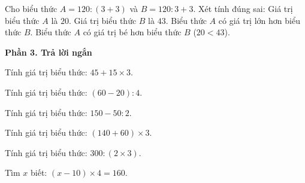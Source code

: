 \begin{ex} %
Cho biểu thức $A = 120 : (3 + 3)$ và $B = 120 : 3 + 3$. Xét tính đúng sai:
\choiceTF
{\True Giá trị biểu thức $A$ là $20$.}
{\True Giá trị biểu thức $B$ là $43$.}
{Biểu thức $A$ có giá trị lớn hơn biểu thức $B$.}
{\True Biểu thức $A$ có giá trị bé hơn biểu thức $B$ ($20 < 43$).}
\end{ex}

\textbf{Phần 3. Trả lời ngắn}

\begin{ex} %
Tính giá trị biểu thức: $45 + 15 \times 3$.
\end{ex}

\begin{ex} %
Tính giá trị biểu thức: $(60 - 20) : 4$.
\end{ex}

\begin{ex} %
Tính giá trị biểu thức: $150 - 50 : 2$.
\end{ex}

\begin{ex} %
Tính giá trị biểu thức: $(140 + 60) \times 3$.
\end{ex}

\begin{ex} %
Tính giá trị biểu thức: $300 : (2 \times 3)$.
\end{ex}

\begin{ex} %
Tìm $x$ biết: $(x - 10) \times 4 = 160$.
\end{ex}
